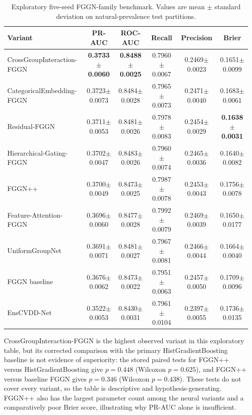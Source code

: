 \documentclass[conference,10pt]{IEEEtran}
\begin{document}
\begin{table}[t]
\centering
\caption{Exploratory five-seed FGGN-family benchmark. Values are mean $\pm$ standard deviation on natural-prevalence test partitions.}
\label{tab:fggn_variants}
\scriptsize
\begin{tabular}{lccccc}
\toprule
\textbf{Variant} & \textbf{PR-AUC} & \textbf{ROC-AUC} & \textbf{Recall} & \textbf{Precision} & \textbf{Brier}\\
\midrule
CrossGroupInteraction-FGGN & \textbf{0.3733$\pm$0.0060} & \textbf{0.8488$\pm$0.0025} & 0.7960$\pm$0.0067 & 0.2469$\pm$0.0023 & 0.1651$\pm$0.0099\\
CategoricalEmbedding-FGGN & 0.3723$\pm$0.0073 & 0.8484$\pm$0.0028 & 0.7965$\pm$0.0073 & 0.2471$\pm$0.0040 & 0.1683$\pm$0.0061\\
Residual-FGGN & 0.3711$\pm$0.0053 & 0.8481$\pm$0.0026 & 0.7978$\pm$0.0083 & 0.2454$\pm$0.0029 & \textbf{0.1638$\pm$0.0031}\\
Hierarchical-Gating-FGGN & 0.3702$\pm$0.0047 & 0.8483$\pm$0.0026 & 0.7960$\pm$0.0074 & 0.2465$\pm$0.0036 & 0.1640$\pm$0.0082\\
FGGN++ & 0.3700$\pm$0.0049 & 0.8473$\pm$0.0025 & 0.7987$\pm$0.0078 & 0.2453$\pm$0.0043 & 0.1756$\pm$0.0078\\
Feature-Attention-FGGN & 0.3696$\pm$0.0060 & 0.8477$\pm$0.0028 & 0.7992$\pm$0.0079 & 0.2469$\pm$0.0039 & 0.1650$\pm$0.0177\\
UniformGroupNet & 0.3691$\pm$0.0071 & 0.8481$\pm$0.0027 & 0.7967$\pm$0.0081 & 0.2466$\pm$0.0044 & 0.1664$\pm$0.0040\\
FGGN baseline & 0.3676$\pm$0.0062 & 0.8473$\pm$0.0022 & 0.7951$\pm$0.0063 & 0.2457$\pm$0.0050 & 0.1709$\pm$0.0096\\
EnsCVDD-Net & 0.3522$\pm$0.0053 & 0.8430$\pm$0.0031 & 0.7961$\pm$0.0104 & 0.2397$\pm$0.0055 & 0.1736$\pm$0.0135\\
\bottomrule
\end{tabular}
\end{table}

CrossGroupInteraction-FGGN is the highest observed variant in this exploratory table, but its corrected comparison with the primary HistGradientBoosting baseline is not evidence of superiority: the stored paired tests for FGGN++ versus HistGradientBoosting give $p=0.448$ (Wilcoxon $p=0.625$), and FGGN++ versus baseline FGGN gives $p=0.346$ (Wilcoxon $p=0.438$). These tests do not cover every variant, so the table is descriptive and hypothesis-generating. FGGN++ also has the largest parameter count among the neural variants and a comparatively poor Brier score, illustrating why PR-AUC alone is insufficient.
\end{document}
